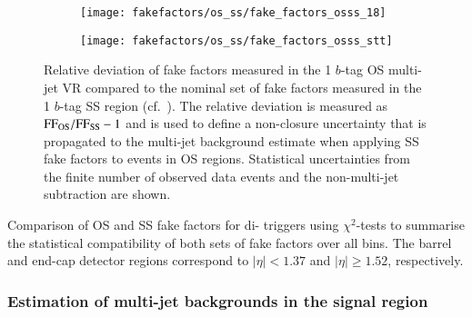 \begin{figure}[htbp]
  \centering

  \begin{subfigure}[t]{0.48\textwidth}
    \texttt{[image: fakefactors/os\_ss/fake\_factors\_osss\_18]}
    \label{fig:fake_factor_OSSS_dtt}
  \end{subfigure}\hfill%
  \begin{subfigure}[t]{0.48\textwidth}
    \texttt{[image: fakefactors/os\_ss/fake\_factors\_osss\_stt]}
    \label{fig:fake_factor_OSSS_stt}
  \end{subfigure}

  \caption{Relative deviation of fake factors measured in the 1
    $b$-tag OS multi-jet VR compared to the nominal set of fake
    factors measured in the 1 $b$-tag SS region (cf.\
    ). The relative
    deviation is measured as $\text{FF}_\text{OS} / \text{FF}_\text{SS} - 1$ and
    is used to define a non-closure uncertainty that is propagated to
    the multi-jet background estimate when applying SS fake factors to
    events in OS regions. Statistical uncertainties from the finite
    number of observed data events and the non-multi-jet subtraction
    are shown.}
  \label{fig:fake_factor_OSSS}
\end{figure}


\begin{table}[htbp]
  \centering

  \caption{Comparison of OS and SS fake factors for di-\tauhadvis
    triggers using $\chi^2$-tests to summarise the statistical
    compatibility of both sets of fake factors over all \tauhadvis \pT
    bins. The barrel and end-cap detector regions correspond to
    \tauhadvis $|\eta| < 1.37$ and $|\eta| \geq 1.52$, respectively.}%
  \label{tab:fake_factor_osss_chi2test}

  
\end{table}


\subsubsection{Estimation of multi-jet backgrounds in the signal region}

